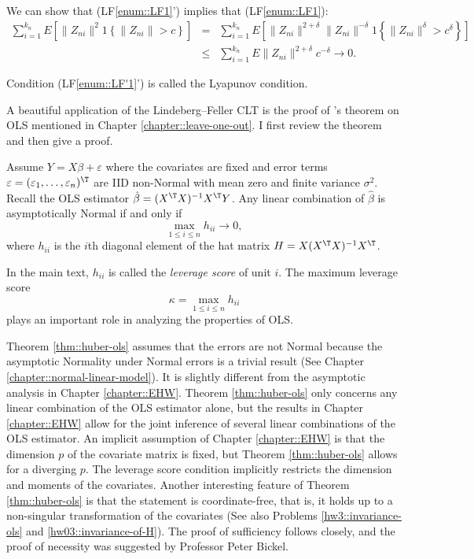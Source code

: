 We can show that (LF\ref{enum::LF1}') implies that (LF\ref{enum::LF1}):
\begin{eqnarray*}
\sum_{i=1}^{k_{n}}E\left[\|Z_{ni}\|^{2}1\left\{ \|Z_{ni}\|>c\right\} \right]
&=& \sum_{i=1}^{k_{n}}E\left[\|Z_{ni}\|^{2+\delta}  \|Z_{ni}\|^{-\delta} 1\left\{ \|Z_{ni}\|^{\delta}>c^{\delta} \right\} \right] \\
&\leq & \sum_{i=1}^{k_{n}}E \|Z_{ni}\|^{2+\delta} c^{- \delta} \rightarrow 0.
\end{eqnarray*}

Condition (LF\ref{enum::LF'1}') is called the Lyapunov condition.




A beautiful application of the Lindeberg--Feller CLT is the proof of \citet{huber1973robust}'s theorem on OLS mentioned in Chapter \ref{chapter::leave-one-out}. I first review the theorem and then give a proof. 


\begin{theorem}
\label{thm::huber-ols}
Assume $Y= X \beta + \varepsilon $ where the covariates are fixed and  error terms $\varepsilon = (\varepsilon_1, \ldots, \varepsilon_n)^{\T}$ are IID non-Normal with mean zero and finite variance $\sigma^2$. Recall the OLS estimator $\hat{\beta} = (X^{\T} X)^{-1} X^{\T} Y$. Any linear combination of $\hat{\beta}$ is asymptotically Normal  if and only if
$$
\max_{1\leq i \leq n} h_{ii} \rightarrow 0 ,
$$
where $h_{ii}$ is the $i$th diagonal element of the hat matrix $H  =  X (X^{\T} X)^{-1} X^{\T}$. 
\end{theorem}


In the main text, $h_{ii}$ is called the {\it leverage score} of unit $i$. The maximum leverage score 
$$
\kappa = \max_{1\leq i \leq n} h_{ii}
$$ 
plays an important role in analyzing the properties of OLS.


Theorem \ref{thm::huber-ols} assumes that the errors are not Normal because the asymptotic Normality under Normal errors is a trivial result (See Chapter \ref{chapter::normal-linear-model}). 
It is slightly different from the asymptotic analysis in Chapter \ref{chapter::EHW}. Theorem \ref{thm::huber-ols} only concerns any linear combination of the OLS estimator alone, but the results in  Chapter \ref{chapter::EHW} allow for the joint inference of several linear combinations of the OLS estimator. An implicit assumption of  Chapter \ref{chapter::EHW} is that the dimension $p$ of the covariate matrix is fixed, but Theorem \ref{thm::huber-ols} allows for a diverging $p$. The leverage score condition implicitly restricts the dimension and moments of the covariates. Another interesting feature of Theorem \ref{thm::huber-ols} is that the statement is coordinate-free, that is, it holds up to a non-singular transformation of the covariates (See also Problems \ref{hw3::invariance-ols} and \ref{hw03::invariance-of-H}). The proof of sufficiency follows \citet{huber1973robust} closely, and the proof of necessity was suggested by Professor Peter Bickel. 


